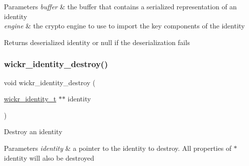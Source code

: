 \begin{DoxyParams}{Parameters}
{\em buffer} & the buffer that contains a serialized representation of an identity \\
\hline
{\em engine} & the crypto engine to use to import the key components of the identity \\
\hline
\end{DoxyParams}
\begin{DoxyReturn}{Returns}
deserialized identity or null if the deserialization fails 
\end{DoxyReturn}
\mbox{\label{group__wickr__identity_ga9e4a0f3736d52836c9a9fc61794c8ddd}} 
\subsubsection{\texorpdfstring{wickr\+\_\+identity\+\_\+destroy()}{wickr\_identity\_destroy()}}
{\footnotesize\ttfamily void wickr\+\_\+identity\+\_\+destroy (\begin{DoxyParamCaption}\item[{\mbox{\hyperlink{structwickr__identity}{wickr\+\_\+identity\+\_\+t}} $\ast$$\ast$}]{identity }\end{DoxyParamCaption})}

Destroy an identity


\begin{DoxyParams}{Parameters}
{\em identity} & a pointer to the identity to destroy. All properties of \textquotesingle{}$\ast$identity\textquotesingle{} will also be destroyed \\
\hline
\end{DoxyParams}
\mbox{\label{group__wickr__identity_ga8ac0f348981ec55ecbf365d6834a3c28}} 
